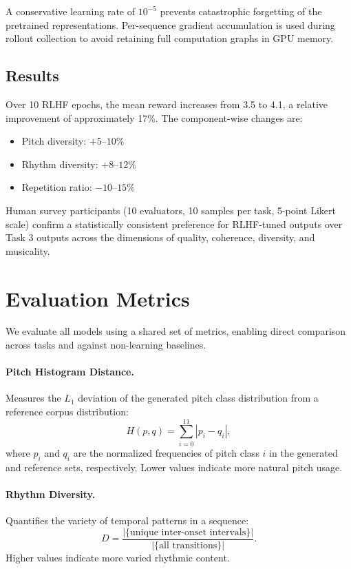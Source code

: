 \documentclass{article}
\begin{document}
A conservative learning rate of $10^{-5}$ prevents catastrophic forgetting of the pretrained representations. Per-sequence gradient accumulation is used during rollout collection to avoid retaining full computation graphs in GPU memory.

\subsection{Results}

Over 10 RLHF epochs, the mean reward increases from 3.5 to 4.1, a relative improvement of approximately 17\%. The component-wise changes are:
\begin{itemize}
  \item Pitch diversity: $+5$--$10\%$
  \item Rhythm diversity: $+8$--$12\%$
  \item Repetition ratio: $-10$--$15\%$
\end{itemize}
Human survey participants (10 evaluators, 10 samples per task, 5-point Likert scale) confirm a statistically consistent preference for RLHF-tuned outputs over Task 3 outputs across the dimensions of quality, coherence, diversity, and musicality.

\section{Evaluation Metrics}
\label{sec:metrics}

We evaluate all models using a shared set of metrics, enabling direct comparison across tasks and against non-learning baselines.

\paragraph{Pitch Histogram Distance.}
Measures the $L_1$ deviation of the generated pitch class distribution from a reference corpus distribution:
\begin{equation}
  H(p, q) = \sum_{i=0}^{11} |p_i - q_i|,
\end{equation}
where $p_i$ and $q_i$ are the normalized frequencies of pitch class $i$ in the generated and reference sets, respectively. Lower values indicate more natural pitch usage.

\paragraph{Rhythm Diversity.}
Quantifies the variety of temporal patterns in a sequence:
\begin{equation}
  D = \frac{|\{\text{unique inter-onset intervals}\}|}{|\{\text{all transitions}\}|}.
\end{equation}
Higher values indicate more varied rhythmic content.
\end{document}
